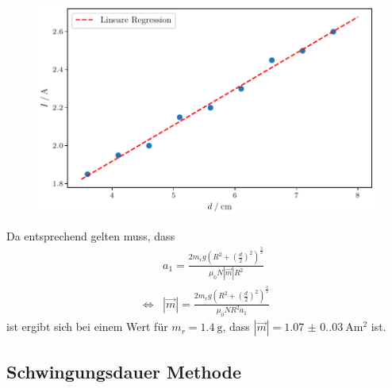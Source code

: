 \begin{figure}[H]
    \centering
    \includegraphics{plot1.pdf}
    \label{fig:grav}
\end{figure}
Da entsprechend gelten muss, dass
\begin{align}
    & a_1=\frac{2m_rg\left(R^2+\left(\frac{d}{2}\right)^2\right)^\frac{3}{2}}{\mu_0N|\vec{m}|R^2} \\
    \iff & |\vec{m}|=\frac{2m_rg\left(R^2+\left(\frac{d}{2}\right)^2\right)^\frac{3}{2}}{\mu_0NR^2a_1}
\end{align}
ist ergibt sich bei einem Wert für $m_r=\qty{1.4}{\gram}$, dass $|\vec{m}|=\qty{1.07(0.03)}{\ampere\meter\squared}$ ist.

\subsection{Schwingungsdauer Methode}

